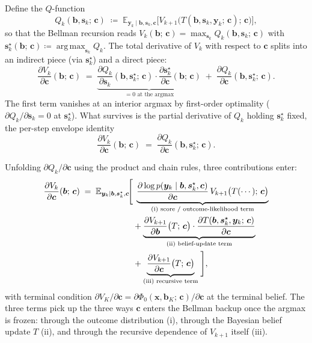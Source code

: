 \documentclass[11pt,a4paper,onecolumn]{article}
\newcommand{\E}{\mathbb{E}}
\newcommand{\argmax}{\operatorname*{arg\,max}}
\newcommand{\bb}{\bm{b}}
\newcommand{\bx}{\bm{x}}
\newcommand{\bc}{\bm{c}}
\newcommand{\bs}{\bm{s}}
\newcommand{\by}{\bm{y}}
\begin{document}
Define the $Q$-function
\begin{equation}
Q_k(\bb, \bs_k;\, \bc) \;\coloneqq\; \E_{\by_k \mid \bb, \bs_k, \bc}\!\bigl[V_{k+1}\bigl(T(\bb, \bs_k, \by_k;\, \bc);\, \bc\bigr)\bigr],
\label{eq:Q_def_paper}
\end{equation}
so that the Bellman recursion reads $V_k(\bb;\, \bc) = \max_{\bs_k} Q_k(\bb, \bs_k;\, \bc)$ with $\bs_k^\star(\bb;\, \bc) \coloneqq \argmax_{\bs_k} Q_k$.  The total derivative of $V_k$ with respect to $\bc$ splits into an indirect piece (via $\bs_k^\star$) and a direct piece:
\begin{equation}
\frac{\partial V_k}{\partial \bc}(\bb;\, \bc)
\;=\; \underbrace{\frac{\partial Q_k}{\partial \bs_k}(\bb, \bs_k^\star;\, \bc) \cdot \frac{\partial \bs_k^\star}{\partial \bc}(\bb;\, \bc)}_{= 0 \text{ at the argmax}}
\;+\; \frac{\partial Q_k}{\partial \bc}(\bb, \bs_k^\star;\, \bc).
\end{equation}
The first term vanishes at an interior argmax by first-order optimality ($\partial Q_k / \partial \bs_k = 0$ at $\bs_k^\star$).  What survives is the partial derivative of $Q_k$ holding $\bs_k^\star$ fixed, the per-step envelope identity
\begin{equation}
\frac{\partial V_k}{\partial \bc}(\bb;\, \bc) \;=\; \frac{\partial Q_k}{\partial \bc}(\bb, \bs_k^\star;\, \bc).
\label{eq:envelope_per_step}
\end{equation}

Unfolding $\partial Q_k / \partial \bc$ using the product and chain rules, three contributions enter:
\begin{align}
\frac{\partial V_k}{\partial \bc}(\bb;\, \bc) \;=\; \E_{\by_k \mid \bb, \bs_k^\star, \bc}\!\Biggl[
&\;\underbrace{\frac{\partial \log p(\by_k \mid \bb, \bs_k^\star, \bc)}{\partial \bc}\, V_{k+1}\bigl(T(\cdots);\, \bc\bigr)}_{\text{(i) score / outcome-likelihood term}} \notag \\
& + \underbrace{\frac{\partial V_{k+1}}{\partial \bb}\bigl(T;\, \bc\bigr) \cdot \frac{\partial T(\bb, \bs_k^\star, \by_k;\, \bc)}{\partial \bc}}_{\text{(ii) belief-update term}} \notag \\
& + \underbrace{\frac{\partial V_{k+1}}{\partial \bc}\bigl(T;\, \bc\bigr)}_{\text{(iii) recursive term}}\;\Biggr],
\label{eq:dV_unfolded}
\end{align}
with terminal condition $\partial V_K / \partial \bc = \partial \Phi_0(\bx, \bb_K;\, \bc) / \partial \bc$ at the terminal belief.  The three terms pick up the three ways $\bc$ enters the Bellman backup once the argmax is frozen: through the outcome distribution (i), through the Bayesian belief update $T$ (ii), and through the recursive dependence of $V_{k+1}$ itself (iii).
\end{document}
